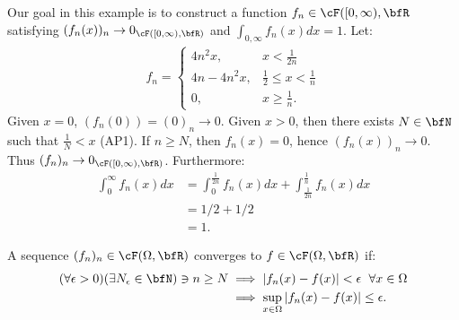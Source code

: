     \begin{example}
        Our goal in this example is to construct a function $f_n \in \cF([0,\infty),\bfR$ satisfying $(f_n(x))_n \rightarrow 0_{\cF([0,\infty),\bfR)}$ and $\int_{0,\infty}f_n(x)dx = 1$. Let:
            \begin{equation*}
            \begin{split}
                f_n = \begin{cases} 4n^2x , & x < \frac{1}{2n}\\ 4n-4n^2x, & \frac{1}{2} \leq x < \frac{1}{n} \\ 0, & x \geq \frac{1}{n}. \end{cases}
            \end{split}
            \end{equation*}
        Given $x = 0$, $(f_n(0)) = (0)_n \rightarrow 0$. Given $x > 0$, then there exists $N \in \bfN$ such that $\frac{1}{N} < x$ (AP1). If $n \geq N$, then $f_n(x) = 0$, hence $(f_n(x))_n \rightarrow 0$. Thus $(f_n)_n \rightarrow 0_{\cF([0,\infty),\bfR)}$. Furthermore:
            \begin{equation*}
            \begin{split}
                \int_0 ^\infty f_n(x)dx &= \int_0^\frac{1}{2n}f_n(x)dx + \int_\frac{1}{2n}^\frac{1}{n}f_n(x)dx \\
                & = 1/2 + 1/2 \\
                & = 1.
            \end{split}
            \end{equation*}
    \end{example}

    \begin{definition}
        A sequence $(f_n)_n \in \cF(\Omega,\bfR)$ converges  to $f \in \cF(\Omega,\bfR)$ if:
            \begin{equation*}
            \begin{split}
                (\forall \epsilon > 0)(\exists N_\epsilon \in \bfN) \ni n \geq N &\implies |f_n(x) - f(x)| < \epsilon \hspace{6pt}\forall x \in \Omega \\
                & \implies \sup_{x \in \Omega}|f_n(x) - f(x)| \leq \epsilon.
            \end{split}
            \end{equation*}
    \end{definition}
